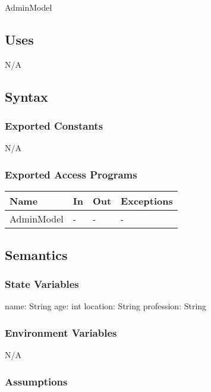 \documentclass[12pt, titlepage]{article}
\begin{document}
AdminModel

\subsection{Uses}

N/A

\subsection{Syntax}

\subsubsection{Exported Constants}

N/A

\subsubsection{Exported Access Programs}

\begin{center}
\begin{tabular}{p{3cm} p{4cm} p{4cm} p{3.5cm}}
\hline
\textbf{Name} & \textbf{In} & \textbf{Out} & \textbf{Exceptions} \\
\hline
AdminModel & - & - & - & \\ 
\hline
\end{tabular}
\end{center}

\subsection{Semantics}

\subsubsection{State Variables}

name: String
age: int
location: String
profession: String

\subsubsection{Environment Variables}

N/A

\subsubsection{Assumptions}
\end{document}
